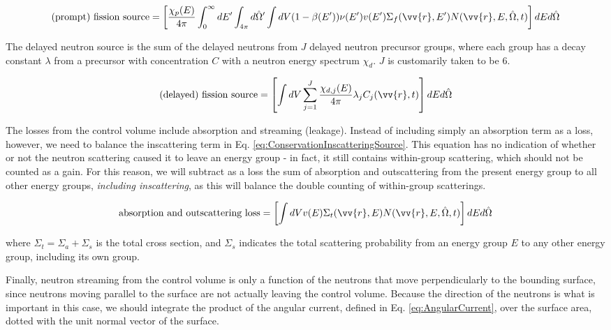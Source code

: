 \documentclass[10pt]{article}
\begin{document}
\begin{flushleft}
\begin{equation}
\label{eq:ConservationFissionPrompt}
\textrm{(prompt) fission source} = \left\lbrack\frac{\chi_p(E)}{4\pi} \int_{0}^{\infty} dE'\int_{4\pi}^{} d\hat{\Omega}'\int dV (1-\beta(E'))\nu(E')v(E')\Sigma_f(\vv{r},E')N(\vv{r}, E, \hat{\Omega},t)\right\rbrack dEd\hat{\Omega}
\end{equation}

The delayed neutron source is the sum of the delayed neutrons from \(J\) delayed neutron precursor groups, where each group has a decay constant \(\lambda\) from a precursor with concentration \(C\) with a neutron energy spectrum \(\chi_d\). \(J\) is customarily taken to be 6.

\begin{equation}
\label{eq:ConservationFissionDelayed}
\textrm{(delayed) fission source} = \left\lbrack\int dV \sum_{j=1}^{J} \frac{\chi_{d,j}(E)}{4\pi} \lambda_j C_j(\vv{r}, t)\right\rbrack dEd\hat{\Omega}
\end{equation}

The losses from the control volume include absorption and streaming (leakage). Instead of including simply an absorption term as a loss, however, we need to balance the inscattering term in Eq. \ref{eq:ConservationInscatteringSource}. This equation has no indication of whether or not the neutron scattering caused it to leave an energy group - in fact, it still contains within-group scattering, which should not be counted as a gain. For this reason, we will subtract as a loss the sum of absorption and outscattering from the present energy group to all other energy groups, \textit{including inscattering}, as this will balance the double counting of within-group scatterings. 

\begin{equation}
\label{eq:ConservationTotal}
\textrm{absorption and outscattering loss}=\left\lbrack\int dV v(E)\Sigma_t(\vv{r}, E) N(\vv{r}, E, \hat{\Omega},t)\right\rbrack dEd\hat{\Omega}
\end{equation}

where \(\Sigma_t=\Sigma_a+\Sigma_s\) is the total cross section, and \(\Sigma_s\) indicates the total scattering probability from an energy group \(E\) to any other energy group, including its own group. 

Finally, neutron streaming from the control volume is only a function of the neutrons that move perpendicularly to the bounding surface, since neutrons moving parallel to the surface are not actually leaving the control volume. Because the direction of the neutrons is what is important in this case, we should integrate the product of the angular current, defined in Eq. \eqref{eq:AngularCurrent}, over the surface area, dotted with the unit normal vector of the surface. 


\end{flushleft}
\end{document}
